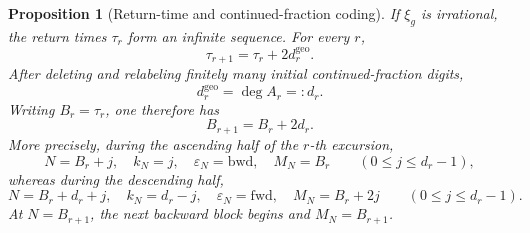\documentclass[11pt]{amsart}
\theoremstyle{definition}
\theoremstyle{plain}
\newtheorem{proposition}[definition]{Proposition}
\newcommand{\fwd}{\mathrm{fwd}}
\newcommand{\bwd}{\mathrm{bwd}}
\begin{document}
\begin{proposition}[Return-time and continued-fraction coding]
\label{prop:cf-coding}
If \(\xi_g\) is irrational, the return times \(\tau_r\) form an infinite
sequence.  For every \(r\),
\[
\tau_{r+1}=\tau_r+2d_r^{\mathrm{geo}}.
\]
After deleting and relabeling finitely many initial continued-fraction digits,
\[
d_r^{\mathrm{geo}}=\deg A_r=:d_r.
\]
Writing \(B_r=\tau_r\), one therefore has
\[
B_{r+1}=B_r+2d_r.
\]
More precisely, during the ascending half of the \(r\)-th excursion,
\[
N=B_r+j,\quad k_N=j,\quad
\varepsilon_N=\bwd,\quad M_N=B_r
\qquad(0\le j\le d_r-1),
\]
whereas during the descending half,
\[
N=B_r+d_r+j,\quad k_N=d_r-j,\quad
\varepsilon_N=\fwd,\quad M_N=B_r+2j
\qquad(0\le j\le d_r-1).
\]
At \(N=B_{r+1}\), the next backward block begins and
\(M_N=B_{r+1}\).
\end{proposition}
\end{document}
